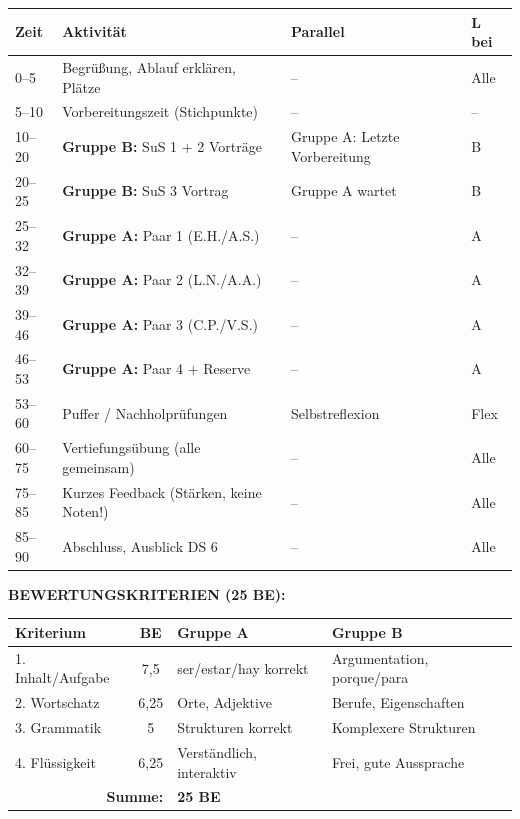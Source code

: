 \documentclass[11pt, a4paper]{article}
\begin{document}
\begin{assessmentbox}[title={DS 5 -- ASSESSMENT (Mo, 19.01.2026)}]
\begin{tabular}{|p{1.2cm}|p{6cm}|p{5cm}|p{1.5cm}|}
\hline
\rowcolor{hellgrau}
\textbf{Zeit} & \textbf{Aktivität} & \textbf{Parallel} & \textbf{L bei} \\
\hline
0--5 & Begrüßung, Ablauf erklären, Plätze & -- & Alle \\
\hline
5--10 & Vorbereitungszeit (Stichpunkte) & -- & -- \\
\hline
10--20 & \textbf{Gruppe B:} SuS 1 + 2 Vorträge & Gruppe A: Letzte Vorbereitung & B \\
\hline
20--25 & \textbf{Gruppe B:} SuS 3 Vortrag & Gruppe A wartet & B \\
\hline
25--32 & \textbf{Gruppe A:} Paar 1 (E.H./A.S.) & -- & A \\
\hline
32--39 & \textbf{Gruppe A:} Paar 2 (L.N./A.A.) & -- & A \\
\hline
39--46 & \textbf{Gruppe A:} Paar 3 (C.P./V.S.) & -- & A \\
\hline
46--53 & \textbf{Gruppe A:} Paar 4 + Reserve & -- & A \\
\hline
53--60 & Puffer / Nachholprüfungen & Selbstreflexion & Flex \\
\hline
60--75 & Vertiefungsübung (alle gemeinsam) & -- & Alle \\
\hline
75--85 & Kurzes Feedback (Stärken, keine Noten!) & -- & Alle \\
\hline
85--90 & Abschluss, Ausblick DS 6 & -- & Alle \\
\hline
\end{tabular}

\vspace{0.2cm}

\textbf{BEWERTUNGSKRITERIEN (25 BE):}

\begin{center}
\small
\begin{tabular}{|l|c|p{5cm}|p{4.5cm}|}
\hline
\rowcolor{hellgrau}
\textbf{Kriterium} & \textbf{BE} & \textbf{Gruppe A} & \textbf{Gruppe B} \\
\hline
1. Inhalt/Aufgabe & 7,5 & ser/estar/hay korrekt & Argumentation, porque/para \\
\hline
2. Wortschatz & 6,25 & Orte, Adjektive & Berufe, Eigenschaften \\
\hline
3. Grammatik & 5 & Strukturen korrekt & Komplexere Strukturen \\
\hline
4. Flüssigkeit & 6,25 & Verständlich, interaktiv & Frei, gute Aussprache \\
\hline
\multicolumn{2}{|r|}{\textbf{Summe:}} & \multicolumn{2}{l|}{\textbf{25 BE}} \\
\hline
\end{tabular}
\end{center}


\end{assessmentbox}
\end{document}
